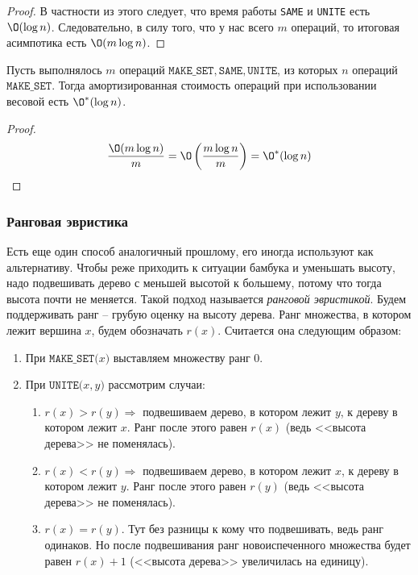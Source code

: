 \begin{proof}
    В частности из этого следует, что время работы \texttt{SAME} и \texttt{UNITE} есть $\O(\log n)$. Следовательно, в силу того, что у нас всего $m$ операций, то итоговая асимпотика есть $\O(m \log n)$.
\end{proof}

\Cons Пусть выполнялось $m$ операций $\texttt{MAKE\_SET}, \texttt{SAME}, \texttt{UNITE}$, из которых $n$ операций $\texttt{MAKE\_SET}$. Тогда амортизированная стоимость операций при использовании весовой есть $\O^*(\log n)$.
\begin{proof}

    \begin{equation*}
        \frac{\O(m \log n)}{m} = \O \left(\frac{m \log n}{m}\right) = \O^*(\log n)
    \end{equation*}
\end{proof}

\subsubsection{Ранговая эвристика\optstar}

Есть еще один способ аналогичный прошлому, его иногда используют как альтернативу. Чтобы реже приходить к ситуации бамбука и уменьшать высоту, надо подвешивать дерево с меньшей высотой к большему, потому что тогда высота почти не меняется.
Такой подход называется \textit{ранговой эвристикой}. Будем поддерживать ранг -- грубую оценку на высоту дерева. Ранг множества, в котором лежит вершина $x$, будем обозначать $r(x)$. Считается она следующим образом:
\begin{enumerate}
    \item При $\texttt{MAKE\_SET(}x\texttt{)}$ выставляем множеству ранг 0.
    \item При $\texttt{UNITE(}x, y\texttt{)}$ рассмотрим случаи:
        \begin{enumerate}
            \item $r(x) > r(y) \Rightarrow$ подвешиваем дерево, в котором лежит $y$, к дереву в котором лежит $x$. Ранг после этого равен $r(x)$ (ведь <<высота дерева>> не поменялась).
            \item $r(x) < r(y) \Rightarrow$ подвешиваем дерево, в котором лежит $x$, к дереву в котором лежит $y$. Ранг после этого равен $r(y)$ (ведь <<высота дерева>> не поменялась).
            \item $r(x) = r(y)$. Тут без разницы к кому что подвешивать, ведь ранг одинаков. Но после подвешивания ранг новоиспеченного множества будет равен $r(x) + 1$ (<<высота дерева>> увеличилась на единицу).
        \end{enumerate}
\end{enumerate}

